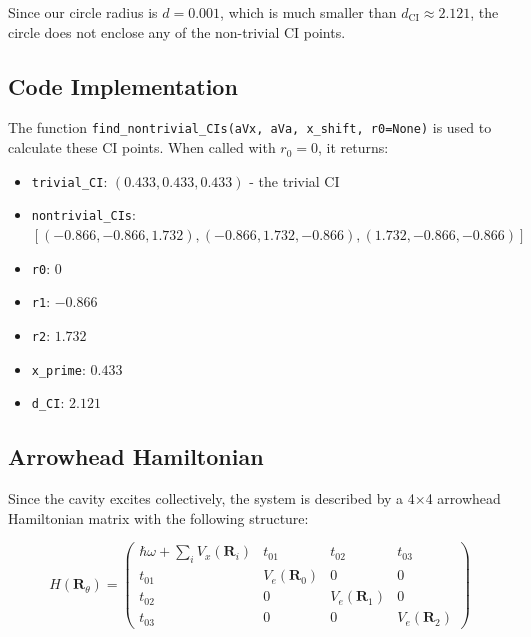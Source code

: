 \documentclass{article}
\begin{document}
Since our circle radius is $d = 0.001$, which is much smaller than $d_{\text{CI}} \approx 2.121$, the circle does not enclose any of the non-trivial CI points.

\subsection{Code Implementation}

The function \texttt{find\_nontrivial\_CIs(aVx, aVa, x\_shift, r0=None)} is used to calculate these CI points. When called with $r_0 = 0$, it returns:

\begin{itemize}
    \item \texttt{trivial\_CI}: $(0.433, 0.433, 0.433)$ - the trivial CI
    \item \texttt{nontrivial\_CIs}: $[(-0.866, -0.866, 1.732), (-0.866, 1.732, -0.866), (1.732, -0.866, -0.866)]$
    \item \texttt{r0}: $0$
    \item \texttt{r1}: $-0.866$
    \item \texttt{r2}: $1.732$
    \item \texttt{x\_prime}: $0.433$
    \item \texttt{d\_CI}: $2.121$
\end{itemize}

\subsection{Arrowhead Hamiltonian}

Since the cavity excites collectively, the system is described by a 4×4 arrowhead Hamiltonian matrix with the following structure:

\begin{equation}
H(\bm{R}_{\theta}) = 
\begin{pmatrix}
\hbar\omega + \sum_i V_x(\bm{R}_i) & t_{01} & t_{02} & t_{03} \\
t_{01} & V_e(\bm{R}_0) & 0 & 0 \\
t_{02} & 0 & V_e(\bm{R}_1) & 0 \\
t_{03} & 0 & 0 & V_e(\bm{R}_2)
\end{pmatrix}
\end{equation}
\end{document}
